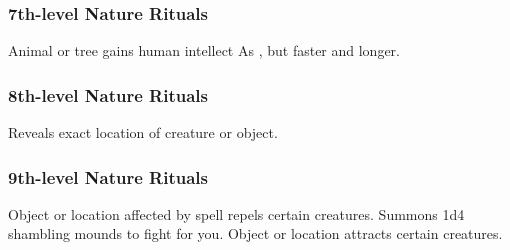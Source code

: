 \subsubsection{7th-level Nature Rituals}
\begin{rituallist}
     Animal or tree gains human intellect
     As , but faster and longer.
\end{rituallist}

\subsubsection{8th-level Nature Rituals}
\begin{rituallist}
     Reveals exact location of creature or object.
\end{rituallist}

\subsubsection{9th-level Nature Rituals}
\begin{rituallist}
     Object or location affected by spell repels certain creatures.
     Summons 1d4 shambling mounds to fight for you.
     Object or location attracts certain creatures.
\end{rituallist}

